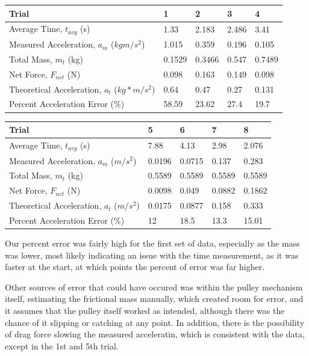\documentclass[11pt, titlepage]{article}
\begin{document}
\begin{center}
\begin{tabular}
{|m{7em}|m{7em}|m{7em}|m{7em}|m{7em}|}
\hline
Trial & 1 & 2 & 3 & 4 \\
\hline
Average Time, $t_{avg}$ (s) & 1.33 & 2.183 & 2.486 & 3.41\\
\hline
Measured Acceleration, $a_m$ ($kgm/s^2$) & 1.015 & 0.359 & 0.196 & 0.105\\
\hline
Total Mass, $m_t$ (kg) & 0.1529 & 0.3466 & 0.547 & 0.7489\\
\hline
Net Force, $F_{net}$ (N) & 0.098 & 0.163 & 0.149 & 0.098\\ 
\hline
Theoretical Acceleration, $a_t$ ($kg*m/s^2$) & 0.64 & 0.47 & 0.27 & 0.131\\
\hline
Percent Acceleration Error (\%) & 58.59 & 23.62 & 27.4 & 19.7\\
\hline
\end{tabular}
\begin{tabular}
{|m{7em}|m{7em}|m{7em}|m{7em}|m{7em}|}
\hline
Trial & 5 & 6 & 7 & 8 \\
\hline
Average Time, $t_{avg}$ (s) & 7.88 & 4.13 & 2.98 & 2.076 \\
\hline
Measured Acceleration, $a_m$ ($m/s^2$) & 0.0196 & 0.0715 & 0.137& 0.283\\
\hline
Total Mass, $m_t$ (kg) & 0.5589 & 0.5589 & 0.5589 & 0.5589\\
\hline
Net Force, $F_{net}$ (N) & 0.0098 & 0.049 & 0.0882 & 0.1862\\ 
\hline
Theoretical Acceleration, $a_t$ ($m/s^2$) & 0.0175 & 0.0877 & 0.158 & 0.333 \\
\hline
Percent Acceleration Error (\%) & 12 & 18.5 & 13.3 & 15.01 \\
\hline
\end{tabular}
\end{center}

Our percent error was fairly high for the first set of data, especially as the mass was lower, most likely indicating an issue with the time measurement, as it was faster at the start, at which points the percent of error was far higher. 

Other sources of error that could have occured was within the pulley mechanism itself, estimating the frictional mass manually, which created room for error, and it assumes that the pulley itself worked as intended, although there was the chance of it slipping or catching at any point. In addition, there is the possibility of drag force slowing the measured acceleratin, which is consistent with the data, except in the 1st and 5th trial.
\end{document}

